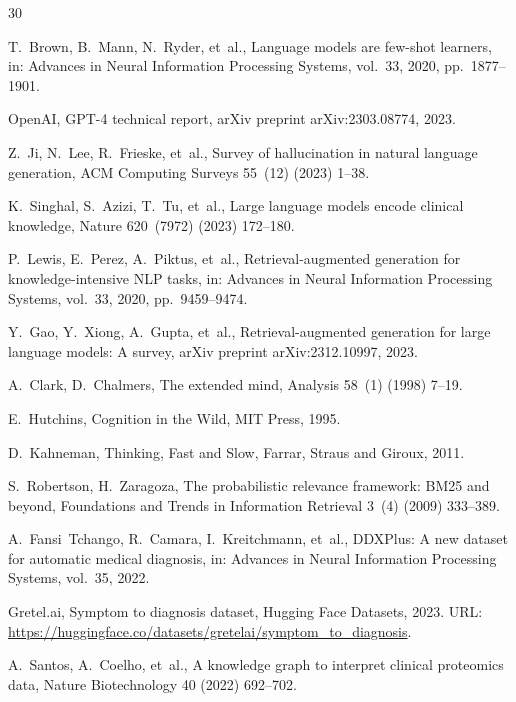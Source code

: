 \documentclass[preprint,12pt]{elsarticle}
\begin{document}
\begin{thebibliography}{30}

T.~Brown, B.~Mann, N.~Ryder, et~al., Language models are few-shot learners, in: Advances in Neural Information Processing Systems, vol.~33, 2020, pp.~1877--1901.

OpenAI, GPT-4 technical report, arXiv preprint arXiv:2303.08774, 2023.

Z.~Ji, N.~Lee, R.~Frieske, et~al., Survey of hallucination in natural language generation, ACM Computing Surveys 55~(12) (2023) 1--38.

K.~Singhal, S.~Azizi, T.~Tu, et~al., Large language models encode clinical knowledge, Nature 620~(7972) (2023) 172--180.

P.~Lewis, E.~Perez, A.~Piktus, et~al., Retrieval-augmented generation for knowledge-intensive NLP tasks, in: Advances in Neural Information Processing Systems, vol.~33, 2020, pp.~9459--9474.

Y.~Gao, Y.~Xiong, A.~Gupta, et~al., Retrieval-augmented generation for large language models: A survey, arXiv preprint arXiv:2312.10997, 2023.

A.~Clark, D.~Chalmers, The extended mind, Analysis 58~(1) (1998) 7--19.

E.~Hutchins, Cognition in the Wild, MIT Press, 1995.

D.~Kahneman, Thinking, Fast and Slow, Farrar, Straus and Giroux, 2011.

S.~Robertson, H.~Zaragoza, The probabilistic relevance framework: BM25 and beyond, Foundations and Trends in Information Retrieval 3~(4) (2009) 333--389.

A.~Fansi~Tchango, R.~Camara, I.~Kreitchmann, et~al., DDXPlus: A new dataset for automatic medical diagnosis, in: Advances in Neural Information Processing Systems, vol.~35, 2022.

Gretel.ai, Symptom to diagnosis dataset, Hugging Face Datasets, 2023. URL: \url{https://huggingface.co/datasets/gretelai/symptom_to_diagnosis}.

A.~Santos, A.~Coelho, et~al., A knowledge graph to interpret clinical proteomics data, Nature Biotechnology 40 (2022) 692--702.


\end{thebibliography}
\end{document}
